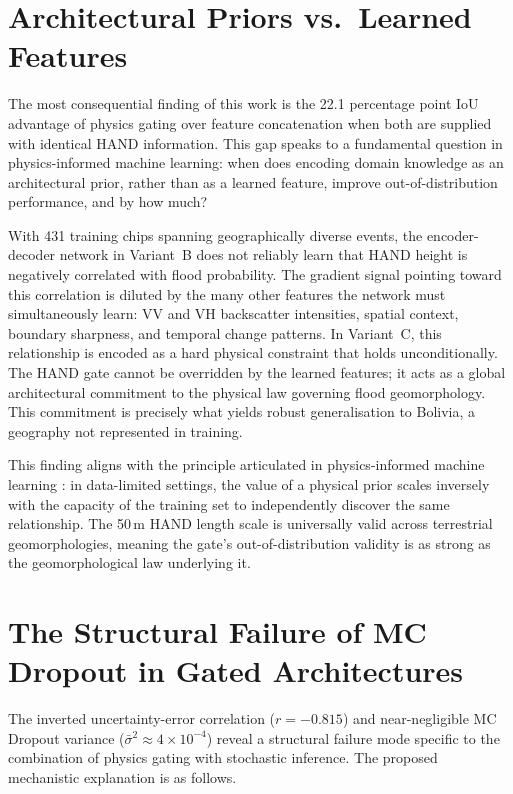 \documentclass[12pt,oneside]{report}
\begin{document}
\section{Architectural Priors vs.\ Learned Features}

The most consequential finding of this work is the 22.1 percentage point IoU
advantage of physics gating over feature concatenation when both are supplied
with identical HAND information.
This gap speaks to a fundamental question in physics-informed machine learning:
when does encoding domain knowledge as an architectural prior, rather than as
a learned feature, improve out-of-distribution performance, and by how much?

With 431 training chips spanning geographically diverse events, the
encoder-decoder network in Variant~B does not reliably learn that HAND height
is negatively correlated with flood probability.
The gradient signal pointing toward this correlation is diluted by the many
other features the network must simultaneously learn: VV and VH backscatter
intensities, spatial context, boundary sharpness, and temporal change patterns.
In Variant~C, this relationship is encoded as a hard physical constraint that
holds unconditionally.
The HAND gate cannot be overridden by the learned features; it acts as a global
architectural commitment to the physical law governing flood geomorphology.
This commitment is precisely what yields robust generalisation to Bolivia, a
geography not represented in training.

This finding aligns with the principle articulated in physics-informed machine
learning \cite{karniadakis2021physics}: in data-limited settings, the value of
a physical prior scales inversely with the capacity of the training set to
independently discover the same relationship.
The 50\,m HAND length scale is universally valid across terrestrial
geomorphologies, meaning the gate's out-of-distribution validity is as strong
as the geomorphological law underlying it.

\section{The Structural Failure of MC Dropout in Gated Architectures}
\label{sec:mc_failure}

The inverted uncertainty-error correlation ($r = -0.815$) and near-negligible
MC Dropout variance ($\bar{\sigma}^2 \approx 4 \times 10^{-4}$) reveal a
structural failure mode specific to the combination of physics gating with
stochastic inference.
The proposed mechanistic explanation is as follows.
\end{document}

